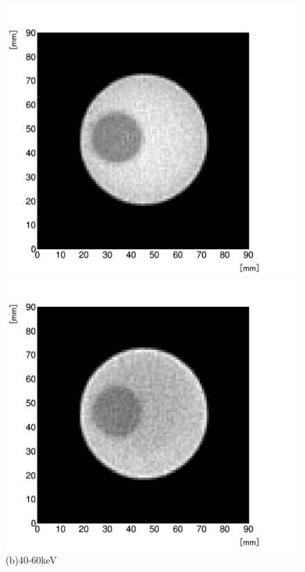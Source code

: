 \begin{figure}[H]
\begin{minipage}{0.5\hsize}
\begin{center}
   \includegraphics[bb=0.000000 0.000000 586.511515 539.955364,width=1.0\hsize]{image2/chapter5/low_contrast_40-60.png}
  \end{center}
\vspace{-1cm}
\caption*{(b)40-60keV}
 \end{minipage}
 \begin{minipage}{0.5\hsize}
  \begin{center}
   \includegraphics[bb=0.000000 0.000000 586.511515 539.955364,width=1.0\hsize]{image2/chapter5/low_contrast_60-90.png}

\end{center}
\end{minipage}
\end{figure}
